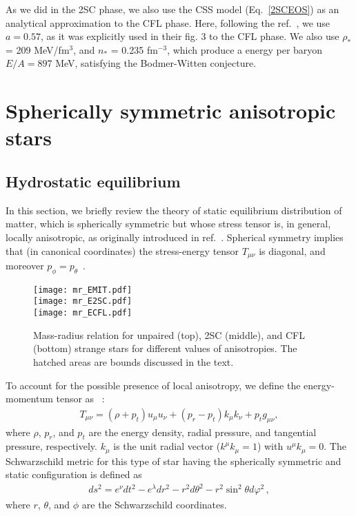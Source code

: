 \documentclass[%
reprint,
superscriptaddress,
nofootinbib,
amsmath,
amssymb,
aps,
floatfix,
showkeys,
]{revtex4-2}
\begin{document}
As we did in the 2SC phase, we also use the CSS model (Eq.~\ref{2SCEOS}) as an analytical approximation to the CFL phase. Here, following the ref.~\cite{Zdunik2013}, we use $a =0.57$, as it was explicitly used in their fig. 3 to the CFL phase. We also use $\rho_*$ = 209 MeV/fm$^3$, and $n_*$ = 0.235 fm$^{-3}$, which produce a energy per baryon $E/A = 897$ MeV, satisfying the Bodmer-Witten conjecture.
\section{Spherically symmetric anisotropic stars}
\subsection{Hydrostatic equilibrium}
In this section, we briefly review the theory of static equilibrium distribution of matter, which is spherically symmetric but whose stress tensor is, in general, locally anisotropic, as originally introduced in ref.~\cite{Bowers_1974}. Spherical symmetry implies that (in canonical coordinates) the stress-energy tensor $T_{\mu\nu}$ is diagonal, and moreover $p_\phi =p_\theta$~\cite{DelgadoeDelgado2018}.
\begin{figure}
    \centering
    \texttt{[image: mr\_EMIT.pdf]} \\
     \texttt{[image: mr\_E2SC.pdf]} \\
       \texttt{[image: mr\_ECFL.pdf]}
    \caption{Mass-radius relation for unpaired (top), 2SC (middle), and  CFL (bottom) strange stars for different values of anisotropies. The hatched areas are bounds discussed in the text.}
    \label{tovs}
\end{figure}

To account for the possible presence of local anisotropy, we define the energy-momentum tensor as ~\cite{Doneva_2012, Silva_2015, Estevez_2018}:
\begin{eqnarray}
    T_{\mu\nu} = (\rho+p_t)u_\mu u_\nu + (p_r-p_t) k_\mu k_\nu + p_t g_{\mu\nu},
    \label{eq:tmunu_aniso}
\end{eqnarray}
where $\rho$, $p_r$, and $p_t$ are the energy density, radial pressure, and tangential pressure, respectively. $k_\mu$ is the unit radial vector ($k^\mu k_\mu = 1$) with $u^\mu k_\mu = 0$. The Schwarzschild metric for this type of star having the spherically symmetric and static configuration is defined as 
\begin{eqnarray}
    ds^2= e^{\nu}dt^2-e^{\lambda}dr^2-r^2d\theta^2-r^2 \sin^2\theta  d\varphi^2\,, \label{Scz}
\end{eqnarray}
where $r$, $\theta$, and $\phi$ are the Schwarzschild coordinates. 
\end{document}

